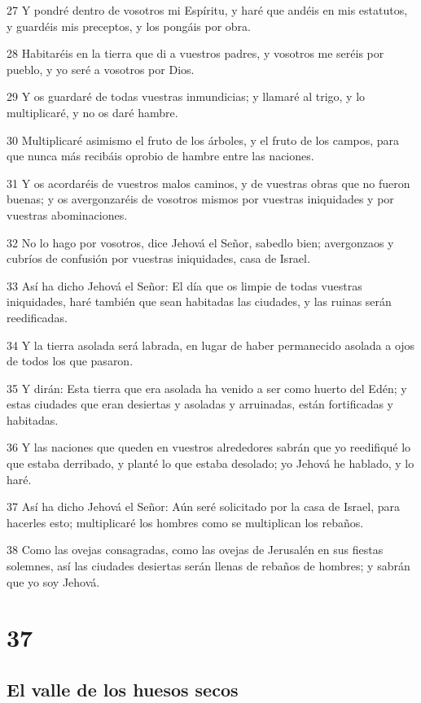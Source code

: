 \par 27 Y pondré dentro de vosotros mi Espíritu, y haré que andéis en mis estatutos, y guardéis mis preceptos, y los pongáis por obra.
\par 28 Habitaréis en la tierra que di a vuestros padres, y vosotros me seréis por pueblo, y yo seré a vosotros por Dios. 
\par 29 Y os guardaré de todas vuestras inmundicias; y llamaré al trigo, y lo multiplicaré, y no os daré hambre.
\par 30 Multiplicaré asimismo el fruto de los árboles, y el fruto de los campos, para que nunca más recibáis oprobio de hambre entre las naciones.
\par 31 Y os acordaréis de vuestros malos caminos, y de vuestras obras que no fueron buenas; y os avergonzaréis de vosotros mismos por vuestras iniquidades y por vuestras abominaciones.
\par 32 No lo hago por vosotros, dice Jehová el Señor, sabedlo bien; avergonzaos y cubríos de confusión por vuestras iniquidades, casa de Israel.
\par 33 Así ha dicho Jehová el Señor: El día que os limpie de todas vuestras iniquidades, haré también que sean habitadas las ciudades, y las ruinas serán reedificadas.
\par 34 Y la tierra asolada será labrada, en lugar de haber permanecido asolada a ojos de todos los que pasaron.
\par 35 Y dirán: Esta tierra que era asolada ha venido a ser como huerto del Edén; y estas ciudades que eran desiertas y asoladas y arruinadas, están fortificadas y habitadas.
\par 36 Y las naciones que queden en vuestros alrededores sabrán que yo reedifiqué lo que estaba derribado, y planté lo que estaba desolado; yo Jehová he hablado, y lo haré.
\par 37 Así ha dicho Jehová el Señor: Aún seré solicitado por la casa de Israel, para hacerles esto; multiplicaré los hombres como se multiplican los rebaños.
\par 38 Como las ovejas consagradas, como las ovejas de Jerusalén en sus fiestas solemnes, así las ciudades desiertas serán llenas de rebaños de hombres; y sabrán que yo soy Jehová.

\chapter{37}

\section*{El valle de los huesos secos}

